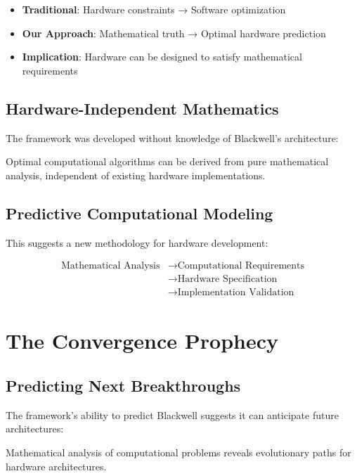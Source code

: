 \documentclass[11pt,a4paper]{article}
\begin{document}
\begin{itemize}
\item \textbf{Traditional}: Hardware constraints → Software optimization
\item \textbf{Our Approach}: Mathematical truth → Optimal hardware prediction
\item \textbf{Implication}: Hardware can be designed to satisfy mathematical requirements
\end{itemize}

\subsection{Hardware-Independent Mathematics}
The framework was developed without knowledge of Blackwell's architecture:

\begin{theorem}
Optimal computational algorithms can be derived from pure mathematical analysis, independent of existing hardware implementations.
\end{theorem}

\subsection{Predictive Computational Modeling}
This suggests a new methodology for hardware development:

\begin{align}
\text{Mathematical Analysis} &\rightarrow \text{Computational Requirements} \\
&\rightarrow \text{Hardware Specification} \\
&\rightarrow \text{Implementation Validation}
\end{align}

\section{The Convergence Prophecy}

\subsection{Predicting Next Breakthroughs}
The framework's ability to predict Blackwell suggests it can anticipate future architectures:

\begin{theorem}
Mathematical analysis of computational problems reveals evolutionary paths for hardware architectures.
\end{theorem}
\end{document}
